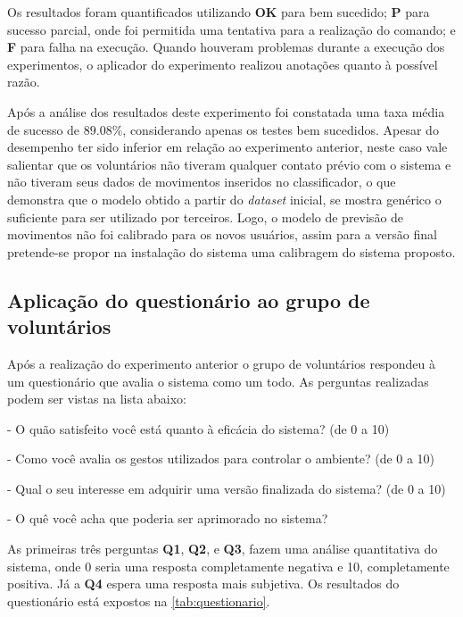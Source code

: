Os resultados foram quantificados utilizando \textbf{OK} para bem sucedido; \textbf{P} para sucesso parcial, onde foi permitida uma tentativa para a realização do comando; e \textbf{F} para falha na execução. Quando houveram problemas durante a execução dos experimentos, o aplicador do experimento realizou anotações quanto à possível razão.


Após a análise dos resultados deste experimento foi constatada uma taxa média de sucesso de $89.08\%$, considerando apenas os testes bem sucedidos. Apesar do desempenho ter sido inferior em relação ao experimento anterior, neste caso vale salientar que os voluntários não tiveram qualquer contato prévio com o sistema e não tiveram seus dados de movimentos inseridos no classificador, o que demonstra que o modelo obtido a partir do \textit{dataset} inicial, se mostra genérico o suficiente para ser utilizado por terceiros. 
Logo, o modelo de previsão de movimentos não foi calibrado para os novos usuários, assim para a versão final pretende-se propor na instalação do sistema uma calibragem do sistema proposto. 




\subsection{Aplicação do questionário ao grupo de voluntários}

Após a realização do experimento anterior o grupo de voluntários respondeu à um questionário que avalia o sistema como um todo. As perguntas realizadas podem ser vistas na lista abaixo:

\begin{description}[noitemsep]
    \item [Q1] - O quão satisfeito você está quanto à eficácia do sistema? (de 0 a 10)
    \item [Q2] - Como você avalia os gestos utilizados para controlar o ambiente? (de 0 a 10)
    \item [Q3] - Qual o seu interesse em adquirir uma versão finalizada do sistema? (de 0 a 10)
    \item [Q4] - O quê você acha que poderia ser aprimorado no sistema?
\end{description}

As primeiras três perguntas \textbf{Q1}, \textbf{Q2}, e \textbf{Q3}, fazem uma análise quantitativa do sistema, onde 0 seria uma resposta completamente negativa e 10, completamente positiva. Já a \textbf{Q4} espera uma resposta mais subjetiva. Os resultados do questionário está expostos na \autoref{tab:questionario}.

